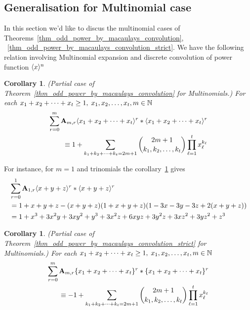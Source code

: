 \documentclass[12pt,letterpaper,oneside,reqno]{amsart}
\newcommand \anglePower [2]{\langle #1 \rangle \sp{#2}}
\newcommand \multifoldSum [2][x]{{#1}\sb{1} + {#1}\sb{2} + \cdots + {#1}\sb{#2}}
\newcommand \curvePower [2]{\{#1\}\sp{#2}}
\newcommand \coeffA [3][A] {{\mathbf{#1}} \sb{#2,#3}}
\newtheorem{cor}[thm]{Corollary}
\numberwithin{equation}{section}
\begin{document}
    \subsection{Generalisation for Multinomial case}
    In this section we'd like to discus the multinomial cases of Theorems~\ref{thm_odd_power_by_macaulays_convolution},
    ~\ref{thm_odd_power_by_macaulays_convolution_strict}.
    We have the following relation involving Multinomial expansion and discrete convolution of
    power function $\anglePower{x}{n}$
    \begin{cor}
        \label{cor_mult_exp_and_macaulay_conv}
        (Partial case of Theorem~\ref{thm_odd_power_by_macaulays_convolution} for Multinomials.)
        For each $\multifoldSum{t} \geq 1, \; x_1, x_2, \ldots, x_t, m \in \mathbb{N}$
        \begin{equation*}
            \begin{split}
                \sum_{r=0}^{m} \coeffA{m}{r} \anglePower{\multifoldSum{t}}{r} \ast \anglePower{\multifoldSum{t}}{r} \\
                \equiv
                1 + \sum_{\multifoldSum[k]{t}=2m+1} \binom{2m+1}{k_1, k_2,\ldots, k_t} \prod_{\ell=1}^{t} x_\ell^{k_\ell}
            \end{split}
        \end{equation*}
    \end{cor}
    For instance, for $m=1$ and trinomials the corollary~\ref{cor_mult_exp_and_macaulay_conv} gives
    \begin{equation*}
        \begin{split}
            &\sum_{r=0}^{1} \coeffA{1}{r} \anglePower{x+y+z}{r} \ast \anglePower{x+y+z}{r} \\
            &=1 + x + y + z - (x + y + z) (1 + x + y + z) (1 - 3 x - 3 y - 3 z + 2 (x + y + z)) \\
            &=1 + x^3 + 3 x^2 y + 3 x y^2 + y^3 + 3 x^2 z + 6 x y z + 3 y^2 z + 3 x z^2 + 3 y z^2 + z^3
        \end{split}
    \end{equation*}
    \begin{cor}
        \label{cor_mult_exp_and_macaulay_conv_strict}
        (Partial case of Theorem~\ref{thm_odd_power_by_macaulays_convolution_strict} for Multinomials.)
        For each $\multifoldSum{t} \geq 1, \; x_1,x_2,\ldots,x_t,m\in\mathbb{N}$
        \begin{equation*}
            \begin{split}
                \sum_{r=0}^{m} \coeffA{m}{r}
                \curvePower{\multifoldSum{t}}{r} \ast \curvePower{\multifoldSum{t}}{r} \\
                \equiv
                -1 + \sum_{\multifoldSum[k]{t}=2m+1} \binom{2m+1}{k_1, k_2,\ldots, k_t}
                \prod_{\ell=1}^{t} x_\ell^{k_\ell}
            \end{split}
        \end{equation*}
    \end{cor}
\end{document}

